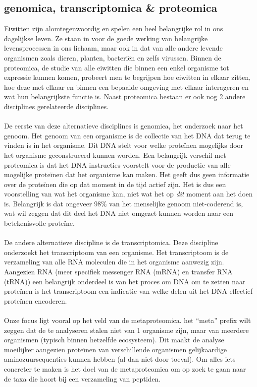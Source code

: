 \documentclass[11pt,dutch,faculty=we,layout=titlefont,underline=false,titleUppercase=true,titleUnderline=true]{ugent2016-report}
\begin{document}
    \subsection{genomica, transcriptomica \& proteomica}\label{subsec:genomica-transcriptomica-&-proteomica}
    Eiwitten zijn alomtegenwoordig en spelen een heel belangrijke rol in ons dagelijkse leven.
    Ze staan in voor de goede werking van belangrijke levensprocessen in ons lichaam, maar ook in dat van alle andere levende organismen zoals dieren, planten, bacteriën en zelfs virussen.
    Binnen de proteomica, de studie van alle eiwitten die binnen een enkel organisme tot expressie kunnen komen, probeert men te begrijpen hoe eiwitten in elkaar zitten, hoe deze met elkaar en binnen een bepaalde omgeving met elkaar interageren en wat hun belangrijkste functie is.
    Naast proteomica bestaan er ook nog 2 andere disciplines gerelateerde disciplines.
    \\ \\
    De eerste van deze alternatieve disciplines is genomica, het onderzoek naar het genoom.
    Het genoom van een organisme is de collectie van het DNA dat terug te vinden is in het organisme.
    Dit DNA stelt voor welke proteïnen mogelijks door het organisme geconstrueerd kunnen worden.
    Een belangrijk verschil met proteomica is dat het DNA instructies voorstelt voor de productie van alle mogelijke proteïnen dat het organisme kan maken.
    Het geeft dus geen informatie over de proteïnen die op dat moment in de tijd actief zijn.
    Het is dus een voorstelling van wat het organisme kan, niet wat het op \textit{dit} moment aan het doen is.
    Belangrijk is dat ongeveer 98\% van het menselijke genoom niet-coderend is, wat wil zeggen dat dit deel het DNA niet omgezet kunnen worden naar een betekenisvolle proteïne.
    \\ \\
    De andere alternatieve discipline is de transcriptomica.
    Deze discipline onderzoekt het transcriptoom van een organisme.
    Het transcriptoom is de verzameling van alle RNA moleculen die in het organisme aanwezig zijn.
    Aangezien RNA (meer specifiek messenger RNA (mRNA) en transfer RNA (tRNA)) een belangrijk onderdeel is van het proces om DNA om te zetten naar proteïnen is het transcriptoom een indicatie van welke delen uit het DNA effectief proteïnen encoderen.
    \\ \\
    Onze focus ligt vooral op het veld van de metaproteomica.
    het ``meta'' prefix wilt zeggen dat de te analyseren stalen niet van 1 organisme zijn, maar van meerdere organismen (typisch binnen hetzelfde ecosysteem).
    Dit maakt de analyse moeilijker aangezien proteïnen van verschillende organismen gelijkaardige aminozuursequenties kunnen hebben (al dan niet door toeval).
    Om alles iets concreter te maken is het doel van de metaproteomica om op zoek te gaan naar de taxa die hoort bij een verzameling van peptiden.
\end{document}

